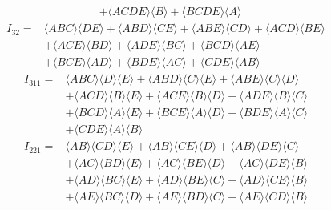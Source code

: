 \begin{subappendices}
\begin{equation}
\begin{aligned}
&+\langle A C D E\rangle\langle B\rangle+\langle B C D E\rangle\langle A\rangle
\end{aligned}\end{equation}
\begin{equation}\begin{aligned}
I_{32}=&\langle A B C\rangle\langle D E\rangle+\langle A B D\rangle\langle C E\rangle+\langle A B E\rangle\langle C D\rangle+\langle A C D\rangle\langle B E\rangle \\
&+\langle A C E\rangle\langle B D\rangle+\langle A D E\rangle\langle B C\rangle+\langle B C D\rangle\langle A E\rangle \\
&+\langle B C E\rangle\langle A D\rangle+\langle B D E\rangle\langle A C\rangle+\langle C D E\rangle\langle A B\rangle
\label{B11}
\end{aligned}\end{equation}
\begin{equation}\begin{aligned}
I_{311}=&\langle A B C\rangle\langle D\rangle\langle E\rangle+\langle A B D\rangle\langle C\rangle\langle E\rangle+\langle A B E\rangle\langle C\rangle\langle D\rangle \\
&+\langle A C D\rangle\langle B\rangle\langle E\rangle+\langle A C E\rangle\langle B\rangle\langle D\rangle+\langle A D E\rangle\langle B\rangle\langle C\rangle \\
&+\langle B C D\rangle\langle A\rangle\langle E\rangle+\langle B C E\rangle\langle A\rangle\langle D\rangle+\langle B D E\rangle\langle A\rangle\langle C\rangle \\
&+\langle C D E\rangle\langle A\rangle\langle B\rangle
\end{aligned}\end{equation}
\begin{equation}\begin{aligned}
I_{221}=&\langle A B\rangle\langle C D\rangle\langle E\rangle+\langle A B\rangle\langle C E\rangle\langle D\rangle+\langle A B\rangle\langle D E\rangle\langle C\rangle \\
&+\langle A C\rangle\langle B D\rangle\langle E\rangle+\langle A C\rangle\langle B E\rangle\langle D\rangle+\langle A C\rangle\langle D E\rangle\langle B\rangle \\
&+\langle A D\rangle\langle B C\rangle\langle E\rangle+\langle A D\rangle\langle B E\rangle\langle C\rangle+\langle A D\rangle\langle C E\rangle\langle B\rangle \\
&+\langle A E\rangle\langle B C\rangle\langle D\rangle+\langle A E\rangle\langle B D\rangle\langle C\rangle+\langle A E\rangle\langle C D\rangle\langle B\rangle \\

\end{aligned}
\end{equation}
\end{subappendices}
